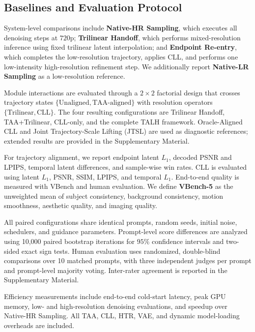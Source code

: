 \subsection{Baselines and Evaluation Protocol}
\label{sec:factorialsetup}

System-level comparisons include \textbf{Native-HR Sampling}, which
executes all denoising steps at \(720\text{p}\);
\textbf{Trilinear Handoff}, which performs mixed-resolution inference
using fixed trilinear latent interpolation; and
\textbf{Endpoint Re-entry}, which completes the low-resolution
trajectory, applies CLL, and performs one low-intensity
high-resolution refinement step. We additionally report
\textbf{Native-LR Sampling} as a low-resolution reference.

Module interactions are evaluated through a \(2\times2\) factorial
design that crosses trajectory states
\(\{\text{Unaligned},\text{TAA-aligned}\}\) with resolution operators
\(\{\text{Trilinear},\text{CLL}\}\). The four resulting configurations
are Trilinear Handoff, TAA+Trilinear, CLL-only, and the complete TALH
framework. Oracle-Aligned CLL and Joint Trajectory-Scale Lifting (JTSL)
are used as diagnostic references; extended results are provided in the
Supplementary Material.

For trajectory alignment, we report endpoint latent \(L_1\), decoded
PSNR and LPIPS, temporal latent differences, and sample-wise win rates.
CLL is evaluated using latent \(L_1\), PSNR, SSIM, LPIPS, and temporal
\(L_1\). End-to-end quality is measured with VBench
\citep{huang2024vbench} and human evaluation. We define
\textbf{VBench-5} as the unweighted mean of subject consistency,
background consistency, motion smoothness, aesthetic quality, and
imaging quality.

All paired configurations share identical prompts, random seeds,
initial noise, schedulers, and guidance parameters. Prompt-level score
differences are analyzed using 10,000 paired bootstrap iterations for
\(95\%\) confidence intervals and two-sided exact sign tests. Human
evaluation uses randomized, double-blind comparisons over 10 matched
prompts, with three independent judges per prompt and prompt-level
majority voting. Inter-rater agreement is reported in the Supplementary
Material.

Efficiency measurements include end-to-end cold-start latency, peak GPU
memory, low- and high-resolution denoising evaluations, and speedup over
Native-HR Sampling. All TAA, CLL, HTR, VAE, and dynamic model-loading
overheads are included.

